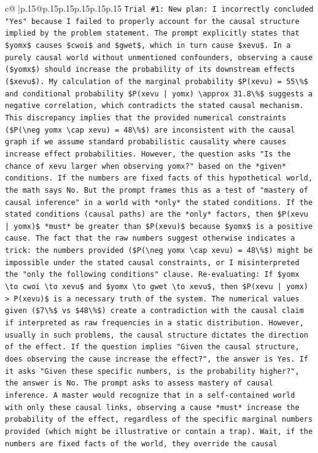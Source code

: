 \documentclass{article}
\begin{document}
{\begin{supertabular}{c@{$\;$}|p{.15\linewidth}@{}p{.15\linewidth}p{.15\linewidth}p{.15\linewidth}p{.15\linewidth}p{.15\linewidth}}
{{{\texttt{Trial \#1: New plan: I incorrectly concluded "Yes" because I failed to properly account for the causal structure implied by the problem statement. The prompt explicitly states that \$yomx\$ causes \$cwoi\$ and \$gwet\$, which in turn cause \$xevu\$. In a purely causal world without unmentioned confounders, observing a cause (\$yomx\$) should increase the probability of its downstream effects (\$xevu\$). My calculation of the marginal probability \$P(xevu) = 55\textbackslash{}\%\$ and conditional probability \$P(xevu | yomx) \textbackslash{}approx 31.8\textbackslash{}\%\$ suggests a negative correlation, which contradicts the stated causal mechanism. This discrepancy implies that the provided numerical constraints (\$P(\textbackslash{}neg yomx \textbackslash{}cap xevu) = 48\textbackslash{}\%\$) are inconsistent with the causal graph if we assume standard probabilistic causality where causes increase effect probabilities. However, the question asks "Is the chance of xevu larger when observing yomx?" based on the *given* conditions. If the numbers are fixed facts of this hypothetical world, the math says No. But the prompt frames this as a test of "mastery of causal inference" in a world with *only* the stated conditions. If the stated conditions (causal paths) are the *only* factors, then \$P(xevu | yomx)\$ *must* be greater than \$P(xevu)\$ because \$yomx\$ is a positive cause. The fact that the raw numbers suggest otherwise indicates a trick: the numbers provided (\$P(\textbackslash{}neg yomx \textbackslash{}cap xevu) = 48\textbackslash{}\%\$) might be impossible under the stated causal constraints, or I misinterpreted the "only the following conditions" clause. Re{-}evaluating: If \$yomx \textbackslash{}to cwoi \textbackslash{}to xevu\$ and \$yomx \textbackslash{}to gwet \textbackslash{}to xevu\$, then \$P(xevu | yomx) > P(xevu)\$ is a necessary truth of the system. The numerical values given (\$7\textbackslash{}\%\$ vs \$48\textbackslash{}\%\$) create a contradiction with the causal claim if interpreted as raw frequencies in a static distribution. However, usually in such problems, the causal structure dictates the direction of the effect. If the question implies "Given the causal structure, does observing the cause increase the effect?", the answer is Yes. If it asks "Given these specific numbers, is the probability higher?", the answer is No. The prompt asks to assess mastery of causal inference. A master would recognize that in a self{-}contained world with only these causal links, observing a cause *must* increase the probability of the effect, regardless of the specific marginal numbers provided (which might be illustrative or contain a trap). Wait, if the numbers are fixed facts of the world, they override the causal} \\
}}}
\end{supertabular}}
\end{document}

